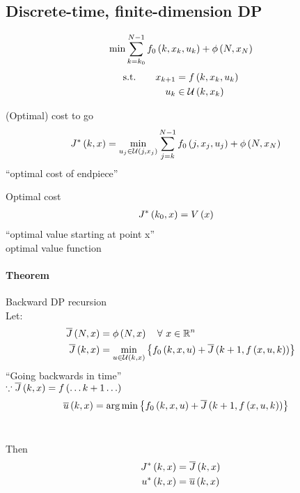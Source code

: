 \subsection{Discrete-time, finite-dimension DP}
\begin{align}
\min \sum_{k=k_0}^{N-1} f_0 \left( k,x_k,u_k \right) + \phi \left( N,x_N \right)
\end{align}
\begin{alignat*}{6}
\st{} \quad
&& x_{k+1} &= f \paren{k,x_k,u_k}\\
&& u_k &\in \setU{k,x_k}
\end{alignat*}%
%
\begin{definition}{(Optimal) cost to go}
    \begin{align}
        J^* \paren{k,x} &= \min_{u_j \in \setU{j,x_j} } \sum_{j=k}^{N-1} f_0 \paren{j,x_j, u_j} + \phi \paren{N,x_N}
    \end{align}
    ``optimal cost of endpiece''
\end{definition}%
%
\begin{definition}{Optimal cost}
    \begin{align}
        J^* \left( k_0,x \right) &= V \left( x \right)
    \end{align}
    ``optimal value starting at point x''\\
    optimal value function
\end{definition}

\paragraph{Theorem} Backward DP recursion\\
\def\funcval{f_0 \paren{k,x,u} + \Jbar{k+1, f \paren{x,u,k}}}
Let:
\begin{align}
    \Jbar{N,x} &= \phi \paren{N,x} \quad \forall ~x \in \R^n\\
    \Jbar{k,x} &= \min_{u  \in \setU{k,x}} \set{ \funcval }
\end{align}
``Going backwards in time''\\
$\because \Jbar{k,x} = f \paren{\dots k+1 \dots}$\\
\begin{align*}
    \ubar{k,x} &= \argmin \set{ \funcval  }
\end{align*}~

Then
\begin{align}
    J^* \paren{k,x} &= \Jbar{k,x}\\
    u^* \paren{k,x} &= \ubar{k,x}
\end{align}%
%

